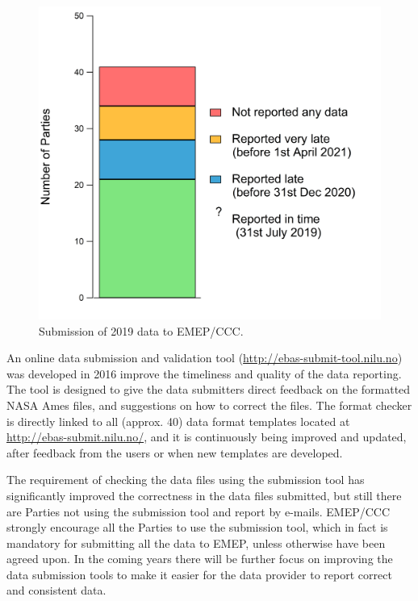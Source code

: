 \begin{figure}[h]
\centering
\includegraphics[width=0.45\paperwidth]{FIGS_Obs/reported.png}
\caption{\label{fig:Submission}Submission of 2019 data to EMEP/CCC.}
 \end{figure}

An online data submission and validation tool (\url{http://ebas-submit-tool.nilu.no}) was developed in 2016 improve  the timeliness and quality of the data reporting. The tool is designed to give the data submitters direct feedback on the formatted NASA Ames files, and suggestions on how to correct the files.  The format checker is directly linked to all (approx. 40) data format templates located at \url{http://ebas-submit.nilu.no/}, and it  is continuously being improved and updated, after feedback from the users or when new templates are developed. 

The requirement of checking the data files using the submission tool has significantly improved the correctness in the data files submitted, but still there are Parties not using the submission tool and report by e-mails. EMEP/CCC strongly encourage all the Parties to use the submission tool, which in fact is mandatory for submitting all the data to EMEP, unless otherwise have been agreed upon. In the coming years there will be further focus on improving the data submission tools to make it easier for the data provider to report correct and consistent data. 

